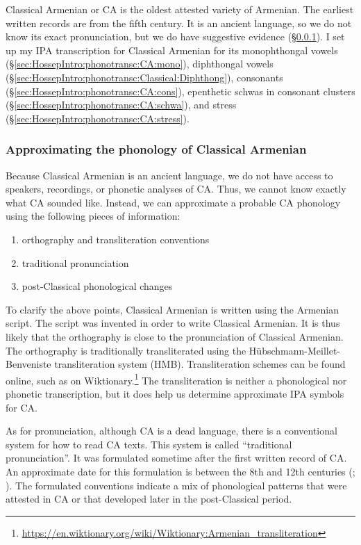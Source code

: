 \documentclass[output=paper]{langscibook}
\begin{document}
Classical Armenian or CA is the oldest attested variety of Armenian. The earliest written records are from the fifth century. It is an ancient language, so we do not know its exact pronunciation, but we do have suggestive evidence (\S\ref{sec:HossepIntro:phonotransc:CA:approx}).  I set up my IPA transcription for  Classical Armenian for its monophthongal vowels (\S\ref{sec:HossepIntro:phonotransc:CA:mono}), diphthongal vowels (\S\ref{sec:HossepIntro:phonotransc:Classical:Diphthong}), consonants (\S\ref{sec:HossepIntro:phonotransc:CA:cons}), epenthetic schwas in consonant clusters (\S\ref{sec:HossepIntro:phonotransc:CA:schwa}), and stress (\S\ref{sec:HossepIntro:phonotransc:CA:stress}). 

 

\subsubsection{Approximating   the phonology of Classical Armenian}\label{sec:HossepIntro:phonotransc:CA:approx}
Because Classical Armenian   is an ancient   language, we do not have access to speakers, recordings, or phonetic analyses of CA. Thus, we cannot know exactly what CA sounded like. Instead, we can approximate a probable CA phonology using the following pieces of information:
\begin{enumerate}
	\item orthography and transliteration conventions
	\item traditional pronunciation
	\item post-Classical phonological changes
\end{enumerate}

To clarify the above points, Classical Armenian is written using the Armenian script. The script was invented in order to write Classical Armenian. It is thus likely that the orthography is close to the pronunciation of Classical Armenian. The orthography is traditionally transliterated using the Hübschmann-Meillet-Benveniste transliteration system (HMB). Transliteration schemes can be found online, such as on Wiktionary.\footnote{\url{https://en.wiktionary.org/wiki/Wiktionary:Armenian_transliteration}} The transliteration is neither a phonological nor phonetic transcription, but it does help us determine approximate IPA symbols for CA. 

As for pronunciation, although CA is a dead language, there is a conventional system for how to read CA texts. This system is called ``traditional pronunciation''. It was formulated sometime after the first written record of CA. An approximate date for this formulation is between the 8th and 12th centuries (\citealt[24]{Godel-1975-IntroClassicalArmenian}; \citealt[1039]{Macak-2017-PhonoClassicalArmenian}). The formulated conventions indicate a mix of phonological patterns that were attested in CA or that developed later in the post-Classical period.
\end{document}
